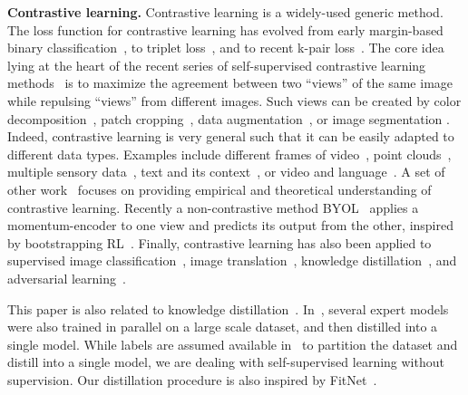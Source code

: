 \documentclass[final]{cvpr}
\begin{document}
\noindent\textbf{Contrastive learning.} Contrastive learning is a widely-used generic method. The loss function for contrastive learning has evolved from early margin-based binary classification~\cite{hadsell2006dimensionality}, to triplet loss~\cite{schroff2015facenet}, and to recent k-pair loss~\cite{sohn2016improved,oord2018representation}. The core idea lying at the heart of the recent series of self-supervised contrastive learning methods~\cite{wu2018unsupervised,oord2018representation,henaff2019data,tian2019contrastive,zhuang2019local,bachman2019learning,he2020momentum,misra2019self,chen2020simple,chen2020improved,tian2020makes,chen2020big,li2020prototypical,cao2020parametric} is to maximize the agreement between two ``views'' of the same image while repulsing ``views'' from different images. Such views can be created by color decomposition~\cite{tian2019contrastive}, patch cropping~\cite{oord2018representation,henaff2019data,bachman2019learning}, data augmentation~\cite{chen2020simple,chen2020big,srinivas2020curl}, or image segmentation \cite{henaff2021efficient, van2021unsupervised, zhang2020self}. Indeed, contrastive learning is very general such that it can be easily adapted to different data types. Examples include different frames of video~\cite{oord2018representation,zhuang2019unsupervised,sermanet2018time,han2019video,gordon2020watching,han2020memory}, point clouds~\cite{xie2020pointcontrast}, multiple sensory data~\cite{morgado2020audio,chung2019perfect,patrick2020multi}, text and its context~\cite{mikolov2013distributed,yang2019xlnet,logeswaran2018efficient,Kong2020A}, or video and language~\cite{sun2019contrastive,miech2019end,li2020learning}. A set of other work~\cite{arora2019theoretical,tian2020makes,zhao2020makes,xiao2020should,tosh2020contrastive,purushwalkam2020demystifying,wang2020understanding} focuses on providing empirical and theoretical understanding of contrastive learning. Recently a non-contrastive method BYOL~\cite{grill2020bootstrap} applies a momentum-encoder to one view and predicts its output from the other, inspired by bootstrapping RL~\cite{guo2020bootstrap}. Finally, contrastive learning has also been applied to supervised image classification~\cite{khosla2020supervised}, image translation~\cite{park2020contrastive}, knowledge distillation~\cite{Tian2020Contrastive,rao2020unified}, and adversarial learning~\cite{kim2020adversarial}.







This paper is also related to knowledge distillation~\cite{hinton2015distilling}. In~\cite{hinton2015distilling}, several expert models were also trained in parallel on a large scale dataset, and then distilled into a single model. While labels are assumed available in~\cite{hinton2015distilling} to partition the dataset and distill into a single model, we are dealing with self-supervised learning without supervision. Our distillation procedure is also inspired by FitNet~\cite{romero2014fitnets}. 
\end{document}
